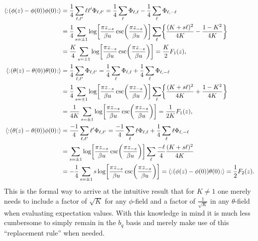 \documentclass[english, parskip=full]{scrartcl}
\begin{document}
\begin{align}
\bra*{\normord{\kla*{\phi(z) - \phi(0)}\phi(0)}} &= \frac{1}{4} \sum_{\ell,\ell'} \ell\ell' \Phi_{\ell,\ell'} = \frac{1}{4} \sum_\ell \Phi_{\ell,\ell} - \frac{1}{4} \sum_\ell \Phi_{\ell,-\ell}\\
&= \frac{1}{4} \sum_{s=\pm 1} \log\klb*{\frac{\pi z_{-s}}{\beta u} \csc\kla*{\frac{\pi z_{-s}}{\beta u}}} \sum_\ell \klc*{\frac{(K+s\ell)^2}{4K} - \frac{1 - K^2}{4K}}\\
&= \frac{K}{4} \sum_{s=\pm 1} \log\klb*{\frac{\pi z_{-s}}{\beta u} \csc\kla*{\frac{\pi z_{-s}}{\beta u}}} = \frac{K}{2}F_1(z),\\
\bra*{\normord{\kla*{\theta(z) - \theta(0)}\theta(0)}} &= \frac{1}{4} \sum_{\ell,\ell'} \Phi_{\ell,\ell'} = \frac{1}{4} \sum_\ell \Phi_{\ell,\ell} + \frac{1}{4} \sum_\ell \Phi_{\ell,-\ell}\\
&= \frac{1}{4} \sum_{s=\pm 1} \log\klb*{\frac{\pi z_{-s}}{\beta u} \csc\kla*{\frac{\pi z_{-s}}{\beta u}}} \sum_\ell \klc*{\frac{(K+s\ell)^2}{4K} + \frac{1 - K^2}{4K}}\\
&= \frac{1}{4K} \sum_{s=\pm 1} \log\klb*{\frac{\pi z_{-s}}{\beta u} \csc\kla*{\frac{\pi z_{-s}}{\beta u}}} = \frac{1}{2K}F_1(z),\\
\bra*{\normord{\kla*{\theta(z) - \theta(0)}\phi(0)}} &= \frac{-1}{4} \sum_{\ell,\ell'} \ell' \Phi_{\ell,\ell'} = \frac{-1}{4} \sum_\ell \ell \Phi_{\ell,\ell} + \frac{1}{4} \sum_\ell \ell \Phi_{\ell,-\ell}\\
&= \sum_{s=\pm 1} \log\klb*{\frac{\pi z_{-s}}{\beta u} \csc\kla*{\frac{\pi z_{-s}}{\beta u}}} \sum_\ell \frac{-\ell}{4} \frac{(K+s\ell)^2}{4K}\\
&= -\frac{1}{4} \sum_{s=\pm 1} s \log\klb*{\frac{\pi z_{-s}}{\beta u} \csc\kla*{\frac{\pi z_{-s}}{\beta u}}}= \bra*{\normord{\kla*{\phi(z) - \phi(0)}\theta(0)}} = \frac{1}{2} F_2(z).
\end{align}
This is the formal way to arrive at the intuitive result that for $K\neq 1$ one merely needs to include a factor of $\sqrt{K}$ for any $\phi$-field and a factor of $\frac{1}{\sqrt{K}}$ in any $\theta$-field when evaluating expectation values.
With this knowledge in mind it is much less cumbersome to simply remain in the $b_q$ basis and merely make use of this ``replacement rule'' when needed.
\end{document}
